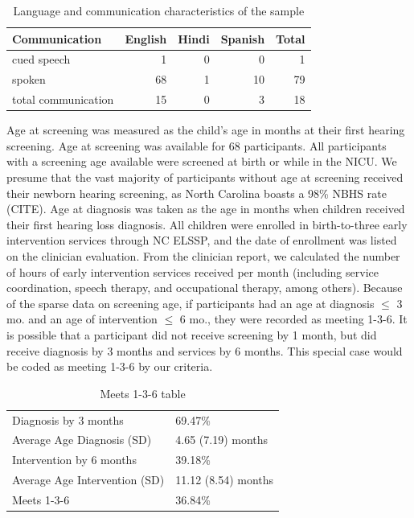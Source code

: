 \documentclass[english,man]{apa6}
\begin{document}
\begin{table}[!h]

\caption{\label{tab:comm-info}Language and communication characteristics of the sample}
\centering
\begin{tabular}[t]{l|r|r|r|r}
\hline
Communication & English & Hindi & Spanish & Total\\
\hline
cued speech & 1 & 0 & 0 & 1\\
\hline
spoken & 68 & 1 & 10 & 79\\
\hline
total communication & 15 & 0 & 3 & 18\\
\hline
\end{tabular}
\end{table}

Age at screening was measured as the child's age in months at their first hearing screening. Age at screening was available for 68 participants. All participants with a screening age available were screened at birth or while in the NICU. We presume that the vast majority of participants without age at screening received their newborn hearing screening, as North Carolina boasts a 98\% NBHS rate (CITE). Age at diagnosis was taken as the age in months when children received their first hearing loss diagnosis. All children were enrolled in birth-to-three early intervention services through NC ELSSP, and the date of enrollment was listed on the clinician evaluation. From the clinician report, we calculated the number of hours of early intervention services received per month (including service coordination, speech therapy, and occupational therapy, among others).
Because of the sparse data on screening age, if participants had an age at diagnosis \(\leq\) 3 mo. and an age of intervention \(\leq\) 6 mo., they were recorded as meeting 1-3-6. It is possible that a participant did not receive screening by 1 month, but did receive diagnosis by 3 months and services by 6 months. This special case would be coded as meeting 1-3-6 by our criteria.

\begin{table}[!h]

\caption{\label{tab:meets136-info}Meets 1-3-6 table}
\centering
\begin{tabular}[t]{l|l}
\hline
 & \\
\hline
Diagnosis by 3 months & 69.47\%\\
\hline
Average Age Diagnosis (SD) & 4.65 (7.19) months\\
\hline
Intervention by 6 months & 39.18\%\\
\hline
Average Age Intervention (SD) & 11.12 (8.54) months\\
\hline
Meets 1-3-6 & 36.84\%\\
\hline
\end{tabular}
\end{table}
\end{document}

